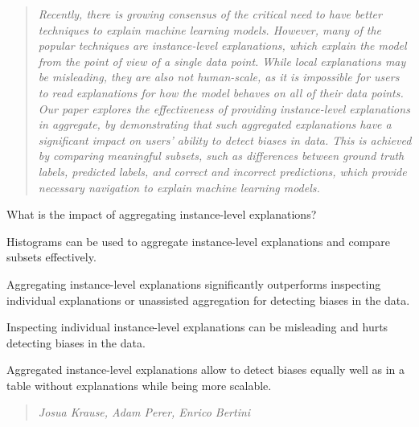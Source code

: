 \begin{quote}\textit{
Recently, there is growing consensus of the critical need to have better techniques to explain machine learning models.  However, many of the popular techniques are instance-level explanations, which explain the model from the point of view of a single data point.  While local explanations may be misleading, they are also not human-scale, as it is impossible for users to read explanations for how the model behaves on all of their data points.  Our paper explores the effectiveness of providing instance-level explanations in aggregate, by demonstrating that such aggregated explanations have a significant impact on users' ability to detect biases in data.
This is achieved by comparing meaningful subsets, such as differences between ground truth labels, predicted labels, and correct and incorrect predictions, which provide necessary navigation to explain machine learning models.
}
\end{quote}

\begin{contributions}{What is the impact of aggregating instance-level explanations?}
\item Histograms can be used to aggregate instance-level explanations and compare subsets effectively.
\item Aggregating instance-level explanations significantly outperforms inspecting individual explanations or unassisted aggregation for detecting biases in the data.
\item Inspecting individual instance-level explanations can be misleading and hurts detecting biases in the data.
\item Aggregated instance-level explanations allow to detect biases equally well as in a table without explanations while being more scalable.
\end{contributions}

\begin{quote}
\textit{Josua Krause, Adam Perer, Enrico Bertini}
\end{quote}

